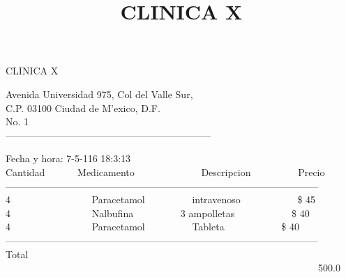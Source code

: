 \documentclass[10pt,a4paper]{letter}
\title{\bf CLINICA X}
\begin{document}
\begin{center}
{\scshape\LARGE CLINICA X\par}
{Avenida Universidad 975, Col del Valle Sur,\\}
{C.P. 03100 Ciudad de M'exico, D.F.}\\ 
{No. 1}\\ 
---------------------------------------------------------------
\end{center}

Fecha y hora: 7-5-116 18:3:13\\

Cantidad \ \ \ \ \ \ Medicamento \ \ \ \ \ \ \ \ \ \ \ \ \  Descripcion  \ \ \ \ \ \ \ \ \ Precio \\
------------------------------------------------------------------------------------------------ \\
4 \ \ \ \ \ \ \ \ \ \ \ \ \ \ \ \ Paracetamol \ \ \ \ \ \ \ \ \ intravenoso \ \ \ \ \ \ \ \ \ \ \ \$ 45 \\
4 \ \ \ \ \ \ \ \ \ \ \ \ \ \ \ \ Nalbufina \ \ \ \ \ \ \ \ \ 3 ampolletas \ \ \ \ \ \ \ \ \ \ \ \$ 40 \\
4 \ \ \ \ \ \ \ \ \ \ \ \ \ \ \ \ Paracetamol \ \ \ \ \ \ \ \ \ Tableta \ \ \ \ \ \ \ \ \ \ \ \$ 40 \\

------------------------------------------------------------------------------------------------ \\
Total	\ \ \ \ \ \ \ \ \ \ \ \ \  \ \ \ \ \ \ \ \ \ \ \ \ \ \ \ \ \ \ \ \ \ \ \ \ \ \ \ \ \ \ \ \ \ \ \ \ \ \ \ \ \  \ \ \ \ \ \ \ \ \ \ 500.0 \\
 
\end{document}
